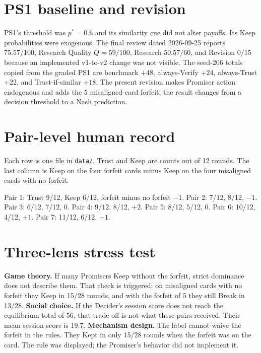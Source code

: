 \section{PS1 baseline and revision}
PS1's threshold was $p^\ast=0.6$ and its similarity cue did not alter payoffs. Its Keep probabilities were exogenous. The final review dated 2026-09-25 reports 75.57/100, Research Quality $Q=59/100$, Research $50.57/60$, and Revision $0/15$ because an implemented v1-to-v2 change was not visible. The seed-206 totals copied from the graded PS1 are benchmark $+48$, always-Verify $+24$, always-Trust $+22$, and Trust-if-similar $+18$. The present revision makes Promiser action endogenous and adds the $5$ misaligned-card forfeit; the result changes from a decision threshold to a Nash prediction.

\section{Pair-level human record}
Each row is one file in \texttt{data/}. Trust and Keep are counts out of 12 rounds. The last column is Keep on the four forfeit cards minus Keep on the four misaligned cards with no forfeit.

Pair 1: Trust 9/12, Keep 6/12, forfeit minus no forfeit $-1$. Pair 2: 7/12, 8/12, $-1$. Pair 3: 6/12, 7/12, $0$. Pair 4: 9/12, 8/12, $+2$. Pair 5: 8/12, 5/12, $0$. Pair 6: 10/12, 4/12, $+1$. Pair 7: 11/12, 6/12, $-1$.

\section{Three-lens stress test}
\textbf{Game theory.} If many Promisers Keep without the forfeit, strict dominance does not describe them. That check is triggered: on misaligned cards with no forfeit they Keep in 15/28 rounds, and with the forfeit of 5 they still Break in 13/28. \textbf{Social choice.} If the Decider's session score does not reach the equilibrium total of 56, that trade-off is not what these pairs received. Their mean session score is 19.7. \textbf{Mechanism design.} The label cannot waive the forfeit in the rules. They Kept in only 15/28 rounds when the forfeit was on the card. The rule was displayed; the Promiser's behavior did not implement it.

